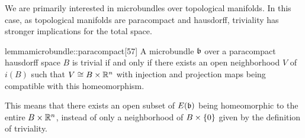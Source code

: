 \begin{myparagraph}
    We are primarily interested in microbundles over topological manifolds.
    In this case, as topological manifolds are paracompact and hausdorff,
    triviality has stronger implications for the total space.
\end{myparagraph}

\begin{mystatement}{lemma}{microbundle::paracompact}[57]
    A microbundle $\bb$ over a paracompact hausdorff space $B$ is trivial
    if and only if there exists an open neighborhood $V$ of $i(B)$ such that $V \cong B \times \mathbb{R}^n$
    with injection and projection maps being compatible with this homeomorphism.
\end{mystatement}

\begin{myparagraph}
    This means that there exists an open subset of $E(\bb)$ being homeomorphic to the entire $B \times \mathbb{R}^n$,
    instead of only a neighborhood of $B \times{} \{0\}$ given by the definition of triviality.
\end{myparagraph}

